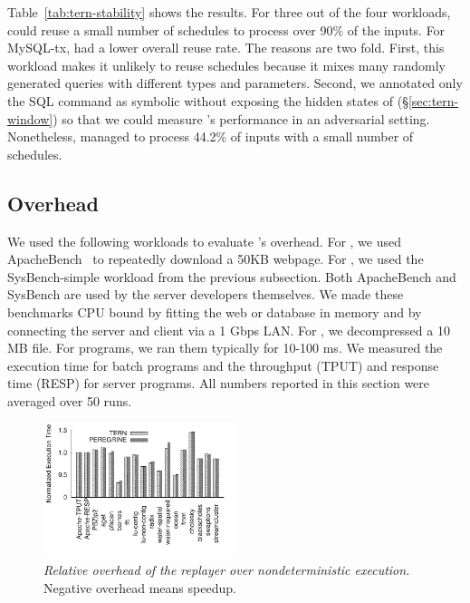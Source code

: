Table~\ref{tab:tern-stability} shows the results.  For three out of the four
workloads, \tern could reuse a small number of schedules to process over
90\% of the inputs.  For MySQL-tx, \tern had a lower overall reuse rate.
The reasons are two fold.  First, this workload makes it unlikely to reuse
schedules because it mixes many randomly generated queries with different
types and parameters.  Second, we annotated only the SQL command as
symbolic without exposing the hidden states of \mysql (\S\ref{sec:tern-window})
so that we could measure \tern's performance in an adversarial setting.
Nonetheless, \tern managed to process 44.2\% of inputs with a small number
of schedules.




\subsection{Overhead} \label{sec:tern-overhead}

We used the following workloads to evaluate \tern's overhead.  For \apache, we
used ApacheBench~\cite{apachebench} to repeatedly download a 50KB webpage.
For \mysql, we used the SysBench-simple workload from the  previous subsection.
Both ApacheBench and SysBench are used by the server developers themselves.
We made these benchmarks CPU bound by fitting the web or
database in memory and by connecting the server and client via a 1 Gbps
LAN.  For \pbzip, we decompressed a 10 MB file.  For \splash programs, we
ran them typically for 10-100 ms.  We measured the execution time for
batch programs and the throughput (TPUT) and response time (RESP) for
server programs.  All numbers reported in this section were averaged over
50 runs.


\begin{figure}[t]
\centering
\includegraphics[width=0.5\textwidth]{tern/figures/overhead}

\caption{\small {\em Relative overhead of the replayer over
    nondeterministic execution.} Negative overhead means speedup.}
\label{fig:tern-overhead}
\end{figure}


